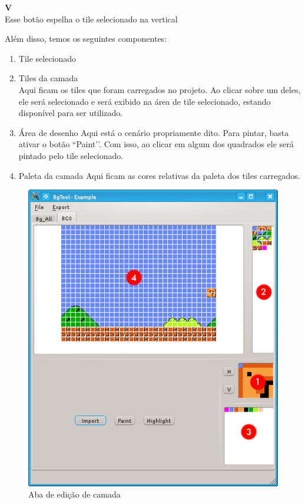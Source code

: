 \documentclass[brazil]{abnt}
\begin{document}
  \textbf{V}\\
           Esse botão espelha o tile selecionado na vertical

Além disso, temos os seguintes componentes:

\begin{enumerate}
  \item Tile selecionado
  \item Tiles da camada\\
           Aqui ficam os tiles que foram carregados no projeto. Ao clicar sobre um deles, ele será selecionado e será exibido na área de tile selecionado, estando disponível para ser utilizado.
  \item Área de desenho
           Aqui está o cenário propriamente dito. Para pintar, basta ativar o botão ``Paint’’. Com isso, ao clicar em algum dos quadrados ele será pintado pelo tile selecionado.
  \item Paleta da camada
           Aqui ficam as cores relativas da paleta dos tiles carregados.
\end{enumerate}

\begin{figure}[h]
\centering
\includegraphics[scale=.5]{imgs/bgtool5.png}
\caption{Aba de edição de camada}
\label{fig:bgtool5}
\end{figure}
\end{document}
